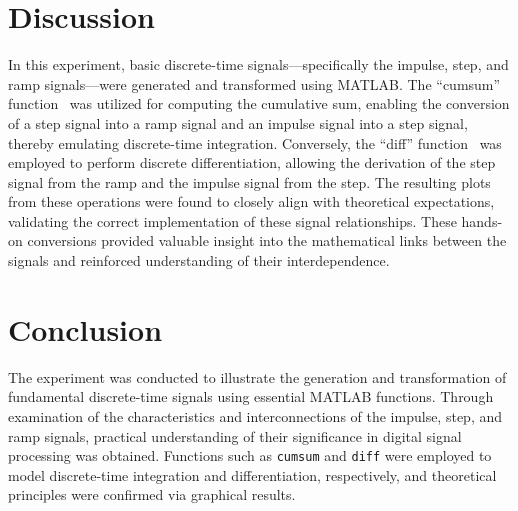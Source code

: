 \documentclass[12pt]{article}
\begin{document}
\section*{Discussion}
In this experiment, basic discrete-time signals—specifically the impulse, step, and ramp signals—were generated and transformed using MATLAB. The “cumsum” function~\cite{matlab_cumsum} was utilized for computing the cumulative sum, enabling the conversion of a step signal into a ramp signal and an impulse signal into a step signal, thereby emulating discrete-time integration. Conversely, the “diff” function~\cite{matlab_diff} was employed to perform discrete differentiation, allowing the derivation of the step signal from the ramp and the impulse signal from the step. The resulting plots from these operations were found to closely align with theoretical expectations, validating the correct implementation of these signal relationships. These hands-on conversions provided valuable insight into the mathematical links between the signals and reinforced understanding of their interdependence.

\section*{Conclusion}
The experiment was conducted to illustrate the generation and transformation of fundamental discrete-time signals using essential MATLAB functions. Through examination of the characteristics and interconnections of the impulse, step, and ramp signals, practical understanding of their significance in digital signal processing was obtained. Functions such as \texttt{cumsum} and \texttt{diff} were employed to model discrete-time integration and differentiation, respectively, and theoretical principles were confirmed via graphical results.


\renewcommand{\bibname}{References}

\end{document}
